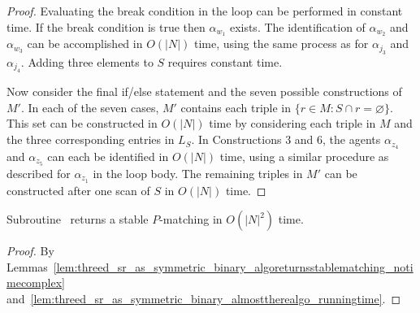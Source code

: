 \begin{proof}
Evaluating the break condition in the loop can be performed in constant time. If the break condition is true then $\alpha_{w_1}$ exists. The identification of $\alpha_{w_2}$ and $\alpha_{w_3}$ can be accomplished in $O(|N|)$ time, using the same process as for $\alpha_{j_3}$ and $\alpha_{j_4}$. Adding three elements to $S$ requires constant time.

Now consider the final if/else statement and the seven possible constructions of $M'$. In each of the seven cases, $M'$ contains each triple in $\{ r \in M : S\cap r = \varnothing \}$. This set can be constructed in $O(|N|)$ time by considering each triple in $M$ and the three corresponding entries in $L_S$. In Constructions 3 and 6, the agents $\alpha_{z_4}$ and $\alpha_{z_5}$ can each be identified in $O(|N|)$ time, using a similar procedure as described for $\alpha_{z_1}$ in the loop body. The remaining triples in $M'$ can be constructed after one scan of $S$ in $O(|N|)$ time.
\end{proof}

\begin{lem}
\label{lem:threed_sr_as_symmetric_binary_algoreturnsstablematching}
Subroutine~ returns a stable $P$\nobreakdash-matching in $O(|N|^2)$ time.
\end{lem}
\begin{proof}
By Lemmas~\ref{lem:threed_sr_as_symmetric_binary_algoreturnsstablematching_notimecomplex} and~\ref{lem:threed_sr_as_symmetric_binary_almosttherealgo_runningtime}.
\end{proof}